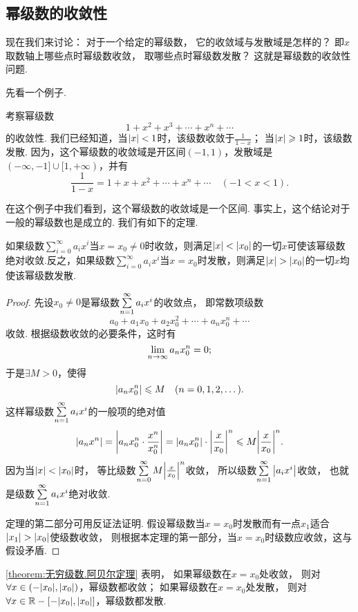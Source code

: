 \subsection{幂级数的收敛性}
现在我们来讨论：
对于一个给定的幂级数，%
它的收敛域与发散域是怎样的？
即\(x\)取数轴上哪些点时幂级数收敛，%
取哪些点时幂级数发散？
这就是幂级数的收敛性问题.

先看一个例子.
\begin{example}
考察幂级数\[
1+x^2+x^3+\dotsb+x^n+\dotsb
\]的收敛性.
我们已经知道，当\(\abs{x}<1\)时，该级数收敛于\(\frac{1}{1-x}\)；
当\(\abs{x}\geqslant1\)时，该级数发散.
因为，这个幂级数的收敛域是开区间\((-1,1)\)，发散域是\((-\infty,-1]\cup[1,+\infty)\)，并有\[
\frac{1}{1-x} = 1+x+x^2+\dotsb+x^n+\dotsb
\quad(-1<x<1).
\]
\end{example}

在这个例子中我们看到，这个幂级数的收敛域是一个区间.
事实上，这个结论对于一般的幂级数也是成立的.
我们有如下的定理.

\begin{theorem}[阿贝尔定理]\label{theorem:无穷级数.阿贝尔定理}
如果级数\(\sum\limits_{i=0}^\infty a_i x^i\)当\(x=x_0\neq0\)时收敛，则满足\(\abs{x}<\abs{x_0}\)的一切\(x\)可使该幂级数绝对收敛.反之，如果级数\(\sum\limits_{i=0}^\infty a_i x^i\)当\(x=x_0\)时发散，则满足\(\abs{x}>\abs{x_0}\)的一切\(x\)均使该幂级数发散.
\begin{proof}
先设\(x_0\neq0\)是幂级数\(\sum\limits_{n=1}^\infty a_i x^i\)的收敛点，%
即常数项级数\[
a_0 + a_1 x_0 + a_2 x_0^2 + \dotsb + a_n x_0^n + \dotsb
\]收敛.
根据级数收敛的必要条件，这时有\[
\lim\limits_{n\to\infty} a_n x_0^n = 0;
\]
于是\(\exists M > 0\)，使得\[
\abs{a_n x_0^n} \leqslant M
\quad(n=0,1,2,\dotsc).
\]
这样幂级数\(\sum\limits_{n=1}^\infty a_i x^i\)的一般项的绝对值\[
\abs{a_n x^n} = \abs{a_n x_0^n \cdot \frac{x^n}{x_0^n}}
= \abs{a_n x_0^n} \cdot \abs{\frac{x}{x_0}}^n
\leqslant M \abs{\frac{x}{x_0}}^n.
\]
因为当\(\abs{x}<\abs{x_0}\)时，%
等比级数\(\sum\limits_{n=0}^\infty M \abs{\frac{x}{x_0}}^n\)收敛，%
所以级数\(\sum\limits_{n=1}^\infty \abs{a_i x^i}\)收敛，%
也就是级数\(\sum\limits_{n=1}^\infty a_i x^i\)绝对收敛.

定理的第二部分可用反证法证明.
假设幂级数当\(x=x_0\)时发散而有一点\(x_1\)适合\(\abs{x_1}>\abs{x_0}\)使级数收敛，%
则根据本定理的第一部分，当\(x=x_0\)时级数应收敛，这与假设矛盾.
\end{proof}
\end{theorem}

\cref{theorem:无穷级数.阿贝尔定理} 表明，%
如果幂级数在\(x=x_0\)处收敛，%
则对\(\forall x\in(-\abs{x_0},\abs{x_0})\)，幂级数都收敛；
如果幂级数在\(x=x_0\)处发散，%
则对\(\forall x\in\mathbb{R}-[-\abs{x_0},\abs{x_0}]\)，幂级数都发散.

